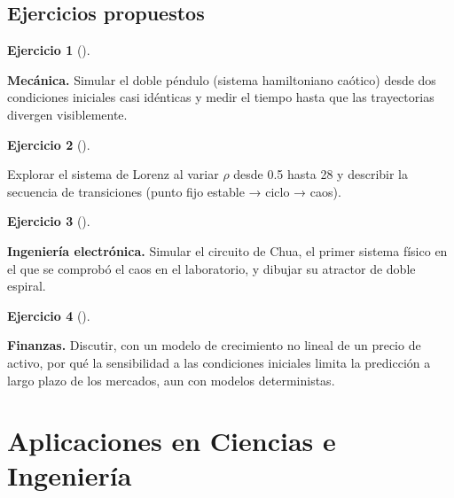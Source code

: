 \documentclass[
  spanish,
  a4paper,
]{scrreport}
\theoremstyle{definition}
\newtheorem{exercise}{Ejercicio}[chapter]
\theoremstyle{remark}
\begin{document}
\section{Ejercicios propuestos}\label{ejercicios-propuestos-9}

\begin{exercise}[]\protect\hypertarget{exr-propuesto-doble-pendulo}{}\label{exr-propuesto-doble-pendulo}

\textbf{Mecánica.} Simular el doble péndulo (sistema hamiltoniano
caótico) desde dos condiciones iniciales casi idénticas y medir el
tiempo hasta que las trayectorias divergen visiblemente.

\end{exercise}

\begin{exercise}[]\protect\hypertarget{exr-propuesto-lorenz-rho}{}\label{exr-propuesto-lorenz-rho}

Explorar el sistema de Lorenz al variar \(\rho\) desde 0.5 hasta 28 y
describir la secuencia de transiciones (punto fijo estable → ciclo →
caos).

\end{exercise}

\begin{exercise}[]\protect\hypertarget{exr-propuesto-chua}{}\label{exr-propuesto-chua}

\textbf{Ingeniería electrónica.} Simular el circuito de Chua, el primer
sistema físico en el que se comprobó el caos en el laboratorio, y
dibujar su atractor de doble espiral.

\end{exercise}

\begin{exercise}[]\protect\hypertarget{exr-propuesto-prediccion-financiera}{}\label{exr-propuesto-prediccion-financiera}

\textbf{Finanzas.} Discutir, con un modelo de crecimiento no lineal de
un precio de activo, por qué la sensibilidad a las condiciones iniciales
limita la predicción a largo plazo de los mercados, aun con modelos
deterministas.

\end{exercise}


\chapter{Aplicaciones en Ciencias e
Ingeniería}\label{aplicaciones-en-ciencias-e-ingenieruxeda}
\end{document}
